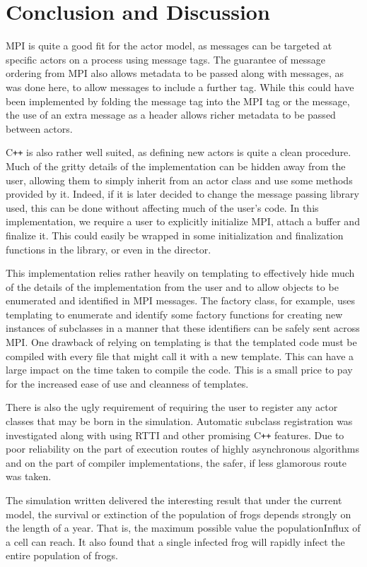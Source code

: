 \documentclass[12pt,a4paper]{article}
\begin{document}
\section{Conclusion and Discussion}
MPI is quite a good fit for the actor model, as messages can be
targeted at specific actors on a process using message tags.
The guarantee of message ordering from MPI also allows metadata to
be passed along with messages, as was done here, to allow messages
to include a further tag.
While this could have been implemented by folding the message tag
into the MPI tag or the message,
the use of an extra message as a header allows richer metadata to be
passed between actors.

C\verb!++! is also rather well suited, as defining new actors is quite
a clean procedure.
Much of the gritty details of the implementation can be hidden away
from the user, allowing them to simply inherit from an actor class
and use some methods provided by it.
Indeed, if it is later decided to change the message passing library used,
this can be done without affecting much of the user's code.
In this implementation, we require a user to explicitly initialize MPI,
attach a buffer and finalize it.
This could easily be wrapped in some initialization and finalization
functions in the library, or even in the director.

This implementation relies rather heavily on templating to effectively
hide much of the details of the implementation from the user
and to allow objects to be enumerated and identified in MPI messages.
The factory class, for example, uses templating to enumerate and identify
some factory functions for creating new instances of subclasses in a
manner that these identifiers can be safely sent across MPI.
One drawback of relying on templating is that the templated code
must be compiled with every file that might call it with a new template.
This can have a large impact on the time taken to compile the code.
This is a small price to pay for the increased ease of use and
cleanness of templates.

There is also the ugly requirement of requiring the user to register
any actor classes that may be born in the simulation.
Automatic subclass registration was investigated along with using
RTTI and other promising C\verb!++! features.
Due to poor reliability on the part of execution routes of highly
asynchronous algorithms and on the part of compiler implementations,
the safer, if less glamorous route was taken.

The simulation written delivered the interesting result that
under the current model,
the survival or extinction of the population of frogs depends strongly
on the length of a year.
That is, the maximum possible value the populationInflux of a cell can
reach.
It also found that a single infected frog will rapidly infect the
entire population of frogs.
\end{document}

